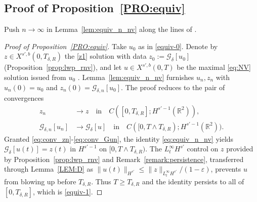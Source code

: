\documentclass[a4paper,
11pt,  reqno]{amsart}
\newcommand{\5}{\textup{V}}
\newcommand{\dl}{\delta}
\newcommand{\eps}{\varepsilon}
\theoremstyle{remark}
\newcommand{\R}{\mathbb{R}}
\newcommand{\Gc}{\mathcal{G}}
\numberwithin{equation}{section}
\numberwithin{theorem}{section}
\begin{document}
\subsection{Proof of Proposition~\ref{PRO:equiv}}

Push $n\to\infty$ in Lemma~\ref{lem:equiv_n_nv} along the lines of
\cite[Proof of Proposition~5.6]{chcora}.

\begin{proof}[Proof of Proposition~\textup{\ref{PRO:equiv}}]
Take $u_0$ as in \eqref{equiv-0}. Denote by
$z\in X^{s',b}(0,T_{\dl,R})$ the \eqref{z1} solution with data
$z_0:=\Gc_\dl[u_0]$ (Proposition~\ref{prop:lwp_rnv}), and let
$u\in X^{s',b}(0,T)$ be the maximal \eqref{eq:NV} solution issued
from $u_0$
\cite{angelopolous,kazeykinamunoz1,kazeykinamunoz2}. Lemma~\ref{lem:equiv_n_nv}
furnishes $u_n,z_n$ with $u_n(0)=u_0$ and
$z_n(0)=\Gc_{\dl,n}[u_0]$. The proof reduces to the pair of
convergences
\begin{align}
\label{eq:conv_zn}
z_n &\to z \quad\text{in}\quad C([0,T_{\dl,R}]; H^{s'-1}(\R^2)),
\\
\label{eq:conv_Gun}
\Gc_{\dl,n}[u_n] &\to \Gc_\dl[u]
\quad\text{in}\quad C([0,T\wedge T_{\dl,R}); H^{s'-1}(\R^2)).
\end{align}
Granted \eqref{eq:conv_zn}-\eqref{eq:conv_Gun}, the identity
\eqref{eq:equiv_n_nv} yields $\Gc_\dl[u(t)]=z(t)$ in $H^{s'-1}$ on
$[0,T\wedge T_{\dl,R})$. The $L^\infty_t H^{s'}$ control on $z$
provided by Proposition~\ref{prop:lwp_rnv} and
Remark~\ref{remark:persistence}, transferred through
Lemma~\ref{LEM:D} as
$\|u(t)\|_{H^{s'}}\le \|z\|_{L^\infty_t H^{s'}}/(1-\eps)$,
prevents $u$ from blowing up before $T_{\dl,R}$. Thus
$T\ge T_{\dl,R}$ and the identity persists to all of
$[0,T_{\dl,R}]$, which is \eqref{equiv-1}.


\end{proof}
\end{document}
